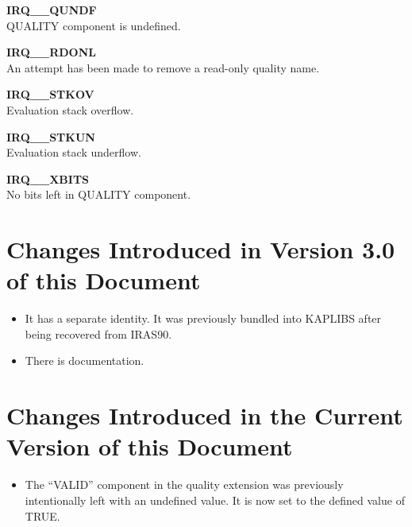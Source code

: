 \documentclass[twoside,11pt,nolof]{starlink}
\begin{document}
\begin{description}
\item \textbf{IRQ\_\_QUNDF}\\
QUALITY component is undefined.
\item \textbf{IRQ\_\_RDONL}\\
An attempt has been made to remove a read-only quality name.
\item \textbf{IRQ\_\_STKOV}\\
Evaluation stack overflow.
\item \textbf{IRQ\_\_STKUN}\\
Evaluation stack underflow.
\item \textbf{IRQ\_\_XBITS}\\
No bits left in QUALITY component.
\end{description}

\section {Changes Introduced in Version 3.0 of this Document}

\begin{itemize}
   \item It has a separate identity.  It was previously bundled into
   KAPLIBS after being recovered from IRAS90.
   \item There is documentation.
\end{itemize}

\section {Changes Introduced in the Current Version of this Document}
\label {SEC:CHANGES}

\begin{itemize}
   \item The ``VALID'' component in the quality extension was previously
   intentionally left with an undefined value. It is now set to the
   defined value of TRUE.
\end{itemize}
\end{document}
